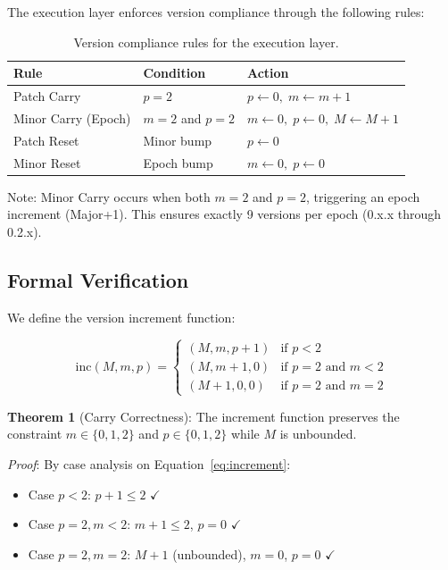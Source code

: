 \documentclass{article}
\begin{document}
The execution layer enforces version compliance through the following rules:

\begin{table}[h]
\centering
\caption{Version compliance rules for the execution layer.}
\label{tab:compliance}
\begin{tabular}{lll}
\toprule
\textbf{Rule} & \textbf{Condition} & \textbf{Action} \\
\midrule
Patch Carry & $p = 2$ & $p \leftarrow 0, \; m \leftarrow m + 1$ \\
Minor Carry (Epoch) & $m = 2$ and $p = 2$ & $m \leftarrow 0, \; p \leftarrow 0, \; M \leftarrow M + 1$ \\
Patch Reset & Minor bump & $p \leftarrow 0$ \\
Minor Reset & Epoch bump & $m \leftarrow 0, \; p \leftarrow 0$ \\
\bottomrule
\end{tabular}
\end{table}

Note: Minor Carry occurs when both $m = 2$ and $p = 2$, triggering an epoch increment (Major+1). This ensures exactly 9 versions per epoch (0.x.x through 0.2.x).

\subsection{Formal Verification}

We define the version increment function:

\begin{equation}
\label{eq:increment}
\text{inc}(M, m, p) = \begin{cases}
(M, m, p+1) & \text{if } p < 2 \\
(M, m+1, 0) & \text{if } p = 2 \text{ and } m < 2 \\
(M+1, 0, 0) & \text{if } p = 2 \text{ and } m = 2
\end{cases}
\end{equation}

\textbf{Theorem 1} (Carry Correctness): The increment function preserves the constraint $m \in \{0, 1, 2\}$ and $p \in \{0, 1, 2\}$ while $M$ is unbounded.

\textit{Proof}: By case analysis on Equation~\ref{eq:increment}:
\begin{itemize}
\item Case $p < 2$: $p+1 \leq 2$ $\checkmark$
\item Case $p = 2, m < 2$: $m+1 \leq 2$, $p = 0$ $\checkmark$
\item Case $p = 2, m = 2$: $M+1$ (unbounded), $m = 0$, $p = 0$ $\checkmark$
\end{itemize}
\end{document}
